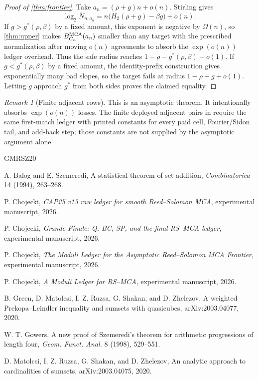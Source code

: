 \documentclass[11pt,a4paper]{amsart}
\numberwithin{equation}{section}
\theoremstyle{remark}
\newtheorem{remark}[theorem]{Remark}
\newcommand{\barN}{\overline N}
\begin{document}
\begin{proof}[Proof of \cref{thm:frontier}]
Take \(a_n=(\rho+g)n+o(n)\).  Stirling gives
\[
        \log_2\barN_{n,a_n}
        = n\bigl(H_2(\rho+g)-\beta g\bigr)+o(n).
\]
If \(g>g^*(\rho,\beta)\) by a fixed amount, this exponent is negative by \(\Omega(n)\), so \cref{thm:upper} makes \(B_{C_n}^{\rm MCA}(a_n)\) smaller than any target with the prescribed normalization after moving \(o(n)\) agreements to absorb the \(\exp(o(n))\) ledger overhead.  Thus the safe radius reaches \(1-\rho-g^*(\rho,\beta)-o(1)\).  If \(g<g^*(\rho,\beta)\) by a fixed amount, the identity-prefix construction gives exponentially many bad slopes, so the target fails at radius \(1-\rho-g+o(1)\).  Letting \(g\) approach \(g^*\) from both sides proves the claimed equality.
\end{proof}

\begin{remark}[Finite adjacent rows]
This is an asymptotic theorem.  It intentionally absorbs \(\exp(o(n))\) losses.  The finite deployed adjacent pairs in \cite{Cho26CapV13,Cho26Grande} require the same first-match ledger with printed constants for every paid cell, Fourier/Sidon tail, and add-back step; those constants are not supplied by the asymptotic argument alone.
\end{remark}

\begin{thebibliography}{GMRSZ20}

A. Balog and E. Szemeredi,
\newblock A statistical theorem of set addition,
\newblock \emph{Combinatorica} 14 (1994), 263--268.

P. Chojecki,
\newblock \emph{CAP25 v13 raw ledger for smooth Reed--Solomon MCA},
\newblock experimental manuscript, 2026.

P. Chojecki,
\newblock \emph{Grande Finale: Q, BC, SP, and the final RS--MCA ledger},
\newblock experimental manuscript, 2026.

P. Chojecki,
\newblock \emph{The Moduli Ledger for the Asymptotic Reed--Solomon MCA Frontier},
\newblock experimental manuscript, 2026.

P. Chojecki,
\newblock \emph{A Moduli Ledger for RS--MCA},
\newblock experimental manuscript, 2026.

B. Green, D. Matolcsi, I. Z. Ruzsa, G. Shakan, and D. Zhelezov,
\newblock A weighted Prekopa--Leindler inequality and sumsets with quasicubes,
\newblock arXiv:2003.04077, 2020.

W. T. Gowers,
\newblock A new proof of Szemeredi's theorem for arithmetic progressions of length four,
\newblock \emph{Geom. Funct. Anal.} 8 (1998), 529--551.

D. Matolcsi, I. Z. Ruzsa, G. Shakan, and D. Zhelezov,
\newblock An analytic approach to cardinalities of sumsets,
\newblock arXiv:2003.04075, 2020.

\end{thebibliography}
\end{document}
